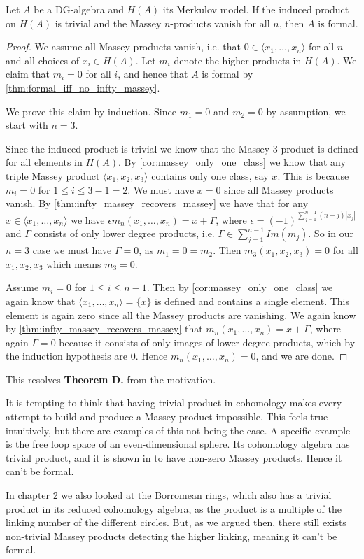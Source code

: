 \begin{theorem}
\label{thm:cuptrivial_no_massey_then_formal}
Let $A$ be a DG-algebra and $H(A)$ its Merkulov model. If the induced product on $H(A)$ is trivial and the Massey $n$-products vanish for all $n$, then $A$ is formal. 
\end{theorem}
\begin{proof}
We assume all Massey products vanish, i.e. that $0\in \langle x_1, \ldots, x_n\rangle $ for all $n$ and all choices of $x_i\in H(A)$. Let $m_i$ denote the higher products in $H(A)$. We claim that $m_i = 0$ for all $i$, and hence that $A$ is formal by \cref{thm:formal_iff_no_infty_massey}. 

We prove this claim by induction. Since $m_1 = 0$ and $m_2 = 0$ by assumption, we start with $n=3$. 

Since the induced product is trivial we know that the Massey 3-product is defined for all elements in $H(A)$. By \cref{cor:massey_only_one_class} we know that any triple Massey product $\langle x_1, x_2, x_3 \rangle$ contains only one class, say $x$. This is because $m_i = 0$ for $1\leq i\leq 3-1=2$. We must have $x=0$ since all Massey products vanish. By \cref{thm:infty_massey_recovers_massey} we have that for any $x\in \langle x_1, \ldots, x_n \rangle$ we have $\epsilon m_n(x_1,\ldots, x_n) = x+\Gamma$, where $ \epsilon = (-1)^{\sum_{j=1}^{n-1} (n-j)|x_j|}$ and $\Gamma$ consists of only lower degree products, i.e. $\Gamma \in \sum_{j=1}^{n-1}Im(m_j)$. So in our $n=3$ case we must have $\Gamma = 0$, as $m_1 = 0 = m_2$. Then $m_3(x_1, x_2, x_3)=0$ for all $x_1, x_2, x_3$ which means $m_3=0$. 

Assume $m_i = 0$ for $1\leq i\leq n-1$. Then by \cref{cor:massey_only_one_class} we again know that $\langle x_1, \ldots, x_n \rangle = \{x\}$ is defined and contains a single element. This element is again zero since all the Massey products are vanishing. We again know by \cref{thm:infty_massey_recovers_massey} that $m_n(x_1, \ldots, x_n)=x+\Gamma$, where again $\Gamma = 0$ because it consists of only images of lower degree products, which by the induction hypothesis are $0$. Hence $m_n(x_1, \ldots, x_n)=0$, and we are done. 
\end{proof}

This resolves \textbf{Theorem D.} from the motivation. 

It is tempting to think that having trivial product in cohomology makes every attempt to build and produce a Massey product impossible. This feels true intuitively, but there are examples of this not being the case. A specific example is the free loop space of an even-dimensional sphere. Its cohomology algebra has trivial product, and it is shown in \cite[Theorem 3.5]{nonformal_loop} to have non-zero Massey products. Hence it can't be formal. 

In chapter 2 we also looked at the Borromean rings, which also has a trivial product in its reduced cohomology algebra, as the product is a multiple of the linking number of the different circles. But, as we argued then, there still exists non-trivial Massey products detecting the higher linking, meaning it can't be formal. 



